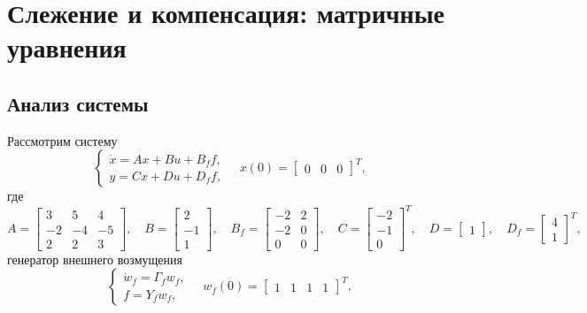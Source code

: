 \section{Слежение и компенсация: матричные уравнения}

\subsection{Анализ системы}

Рассмотрим систему
\begin{equation}
    \label{eq:sys1}
    \begin{cases}
        \dot x=Ax+Bu+B_ff,\\
        y=Cx+Du+D_ff,
    \end{cases}\quad
    x(0)=\begin{bmatrix}
        0&0&0
    \end{bmatrix}^T,
\end{equation}
где
\begin{equation*}
    A=\begin{bmatrix}
        3&5&4\\-2&-4&-5\\2&2&3
    \end{bmatrix},\quad
    B=\begin{bmatrix}
        2\\-1\\1
    \end{bmatrix},\quad
    B_f=\begin{bmatrix}
        -2&2\\-2&0\\0&0
    \end{bmatrix},\quad
    C=\begin{bmatrix}
        -2\\-1\\0
    \end{bmatrix}^T,\quad
    D=\begin{bmatrix}
        1
    \end{bmatrix},\quad
    D_f=\begin{bmatrix}
        4\\1
    \end{bmatrix}^T,
\end{equation*}
генератор внешнего возмущения
\begin{equation}
    \label{eq:sys1gen}
    \begin{cases}
        \dot w_f=\Gamma_fw_f,\\
        f=Y_fw_f,
    \end{cases}\quad
    w_f(0)=\begin{bmatrix}
        1&1&1&1
    \end{bmatrix}^T,
\end{equation}
